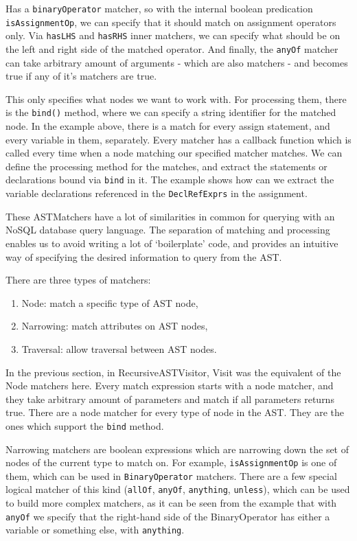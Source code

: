 \documentclass[oneside,12pt,a4paper]{book}
\begin{document}
Has a \texttt{binaryOperator} matcher, so with the internal boolean predication \\ \texttt{isAssignmentOp}, we can specify that it should match on assignment operators only. Via \texttt{hasLHS} and \texttt{hasRHS} inner matchers, we can specify what should be on the left and right side of the matched operator. And finally, the \texttt{anyOf} matcher can take arbitrary amount of arguments - which are also matchers - and becomes true if any of it's matchers are true. 

This only specifies what nodes we want to work with. For processing them, there is the \texttt{bind()} method, where we can specify a string identifier for the matched node. In the example above, there is a match for every assign statement, and every variable in them, separately. Every matcher has a callback function which is called every time when a node matching our specified matcher matches. We can define the processing method for the matches, and extract the statements or declarations bound via \texttt{bind} in it. The example shows how can we extract the variable declarations referenced in the \texttt{DeclRefExprs} in the assignment.

These ASTMatchers have a lot of similarities in common for querying with an NoSQL database query language. The separation of matching and processing enables us to avoid writing a lot of `boilerplate' code, and provides an intuitive way of specifying the desired information to query from the AST.

There are three types of matchers:
\begin{enumerate}
\item Node: match a specific type of AST node,
\item Narrowing: match attributes on AST nodes,
\item Traversal: allow traversal between AST nodes.
\end{enumerate}

In the previous section, in RecursiveASTVisitor, Visit was the equivalent of the Node matchers here. Every match expression starts with a node matcher, and they take arbitrary amount of parameters and match if all parameters returns true. There are a node matcher for every type of node in the AST. They are the ones which support the \texttt{bind} method. 

Narrowing matchers are boolean expressions which are narrowing down the set of nodes of the current type to match on. For example, \texttt{isAssignmentOp} is one of them, which can be used in \texttt{BinaryOperator} matchers. There are a few special logical matcher of this kind (\texttt{allOf}, \texttt{anyOf}, \texttt{anything}, \texttt{unless}), which can be used to build more complex matchers, as it can be seen from the example that with \texttt{anyOf} we specify that the right-hand side of the BinaryOperator has either a variable or something else, with \texttt{anything}. 
\end{document}
